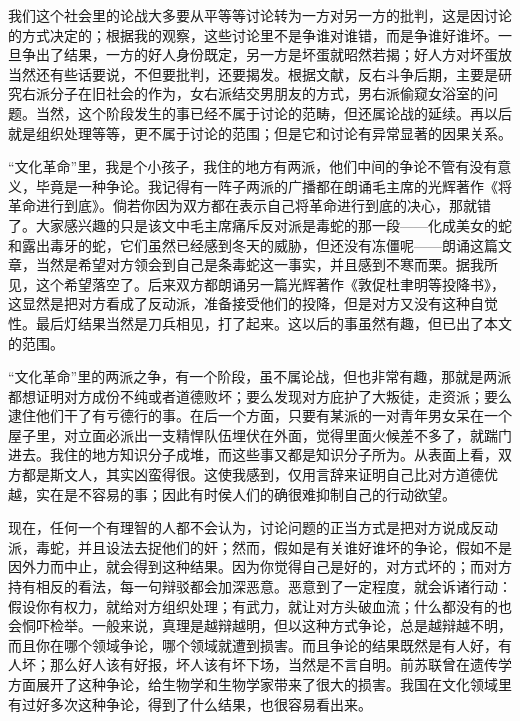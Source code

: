 我们这个社会里的论战大多要从平等等讨论转为一方对另一方的批判，这是因讨论的方式决定的；根据我的观察，这些讨论里不是争谁对谁错，而是争谁好谁坏。一旦争出了结果，一方的好人身份既定，另一方是坏蛋就昭然若揭；好人方对坏蛋放当然还有些话要说，不但要批判，还要揭发。根据文献，反右斗争后期，主要是研究右派分子在旧社会的作为，女右派结交男朋友的方式，男右派偷窥女浴室的问题。当然，这个阶段发生的事已经不属于讨论的范畴，但还属论战的延续。再以后就是组织处理等等，更不属于讨论的范围；但是它和讨论有异常显著的因果关系。 

“文化革命”里，我是个小孩子，我住的地方有两派，他们中间的争论不管有没有意义，毕竟是一种争论。我记得有一阵子两派的广播都在朗诵毛主席的光辉著作《将革命进行到底》。倘若你因为双方都在表示自己将革命进行到底的决心，那就错了。大家感兴趣的只是该文中毛主席痛斥反对派是毒蛇的那一段——化成美女的蛇和露出毒牙的蛇，它们虽然已经感到冬天的威胁，但还没有冻僵呢——朗诵这篇文章，当然是希望对方领会到自己是条毒蛇这一事实，并且感到不寒而栗。据我所见，这个希望落空了。后来双方都朗诵另一篇光辉著作《敦促杜聿明等投降书》，这显然是把对方看成了反动派，准备接受他们的投降，但是对方又没有这种自觉性。最后灯结果当然是刀兵相见，打了起来。这以后的事虽然有趣，但已出了本文的范围。 

“文化革命”里的两派之争，有一个阶段，虽不属论战，但也非常有趣，那就是两派都想证明对方成份不纯或者道德败坏；要么发现对方庇护了大叛徒，走资派；要么逮住他们干了有亏德行的事。在后一个方面，只要有某派的一对青年男女呆在一个屋子里，对立面必派出一支精悍队伍埋伏在外面，觉得里面火候差不多了，就踹门进去。我住的地方知识分子成堆，而这些事又都是知识分子所为。从表面上看，双方都是斯文人，其实凶蛮得很。这使我感到，仅用言辞来证明自己比对方道德优越，实在是不容易的事；因此有时侯人们的确很难抑制自己的行动欲望。 

现在，任何一个有理智的人都不会认为，讨论问题的正当方式是把对方说成反动派，毒蛇，并且设法去捉他们的奸；然而，假如是有关谁好谁坏的争论，假如不是因外力而中止，就会得到这种结果。因为你觉得自己是好的，对方式坏的；而对方持有相反的看法，每一句辩驳都会加深恶意。恶意到了一定程度，就会诉诸行动：假设你有权力，就给对方组织处理；有武力，就让对方头破血流；什么都没有的也会恫吓检举。一般来说，真理是越辩越明，但以这种方式争论，总是越辩越不明，而且你在哪个领域争论，哪个领域就遭到损害。而且争论的结果既然是有人好，有人坏；那么好人该有好报，坏人该有坏下场，当然是不言自明。前苏联曾在遗传学方面展开了这种争论，给生物学和生物学家带来了很大的损害。我国在文化领域里有过好多次这种争论，得到了什么结果，也很容易看出来。 

